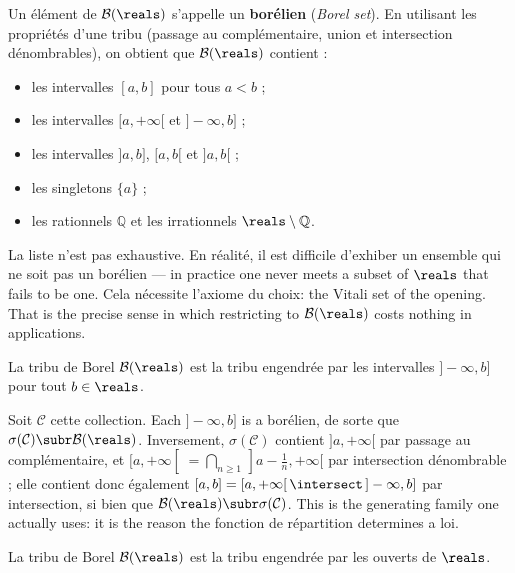 Un élément de $\mathcal{B}(\reals)$ s'appelle un \textbf{borélien} (\textit{Borel
set}). En utilisant les propriétés d'une tribu (passage au complémentaire, union
et intersection dénombrables), on obtient que $\mathcal{B}(\reals)$ contient :
\begin{itemize}
  \item les intervalles $[a,b]$ pour tous $a < b$ ;
  \item les intervalles $[a,+\infty[$ et $]-\infty,b]$ ;
  \item les intervalles $]a,b]$, $[a,b[$ et $]a,b[$ ;
  \item les singletons $\{a\}$ ;
  \item les rationnels $\mathbb{Q}$ et les irrationnels $\reals \setminus \mathbb{Q}$.
\end{itemize}
La liste n'est pas exhaustive. En réalité, il est difficile d'exhiber un ensemble
qui ne soit pas un borélien --- in practice one never meets a subset of $\reals$
that fails to be one. Cela nécessite l'axiome du choix: the Vitali set of the
opening. That is the precise sense in which restricting to $\mathcal{B}(\reals)$
costs nothing in applications.

\begin{prop}
  La tribu de Borel $\mathcal{B}(\reals)$ est la tribu engendrée par les intervalles
  $]-\infty,b]$ pour tout $b \in \reals$.
\end{prop}

\begin{remark}
  Soit $\mathcal{C}$ cette collection. Each $]-\infty,b]$ is a borélien, de sorte
  que $\sigma(\mathcal{C}) \subr \mathcal{B}(\reals)$. Inversement,
  $\sigma(\mathcal{C})$ contient $]a,+\infty[$ par passage au complémentaire, et
  $[a,+\infty[ \; = \bigcap_{n \geq 1} \,]a - \tfrac{1}{n}, +\infty[$ par
  intersection dénombrable ; elle contient donc également $[a,b] = [a,+\infty[
  \,\intersect\, ]-\infty,b]$ par intersection, si bien que $\mathcal{B}(\reals)
  \subr \sigma(\mathcal{C})$. This is the generating family one actually uses: it is
  the reason the fonction de répartition determines a loi.
\end{remark}

\begin{prop}
  La tribu de Borel $\mathcal{B}(\reals)$ est la tribu engendrée par les ouverts de
  $\reals$.
\end{prop}

